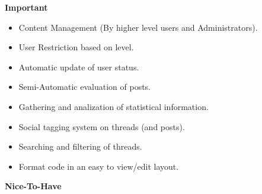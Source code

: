 \documentclass[a4paper,12pt]{report}
\begin{document}
\textbf{Important} 
\begin{itemize}
  \item Content Management (By higher level users and Administrators).
  \item User Restriction based on level.
	\begin{center}
	\end{center}	
  \item Automatic update of user status.
  \item Semi-Automatic evaluation of posts.
  \item Gathering and analization of statistical information.
	\begin{center}
	\end{center}
  \item Social tagging system on threads (and posts).
	\begin{center}
	\end{center}
  \item Searching and filtering of threads.
	\begin{center}
	\end{center}
  \item Format code in an easy to view/edit layout.
	\begin{center}
	\end{center}
\end{itemize}
\textbf{Nice-To-Have} 
\end{document}
